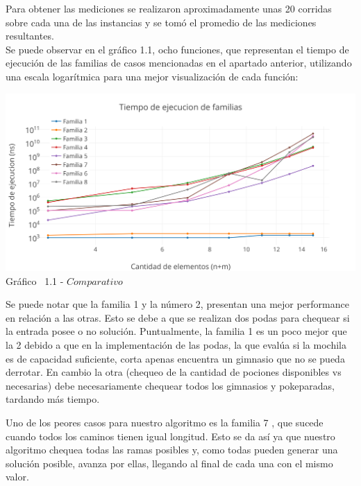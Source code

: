 Para obtener las mediciones se realizaron aproximadamente unas 20 corridas sobre cada una de las instancias y se tom\'o el promedio de las mediciones resultantes.\\ 

Se puede observar en el  gráfico 1.1, ocho funciones, que representan el tiempo de ejecuci\'on de las familias de casos mencionadas en el apartado anterior, utilizando una escala logar\'itmica para una mejor visualizaci\'on de cada funci\'on:\\


\vspace*{0.3cm} \vspace*{0.3cm}
  \begin{center}
 \includegraphics[scale=0.65]{./EJ1/comparativo.png}
 {Gr\'afico \ 1.1 - $Comparativo$}
  \end{center}
  \vspace*{0.3cm}

  
Se puede notar que la familia 1 y la n\'umero 2, presentan una mejor performance en relaci\'on a las otras. Esto se debe a que se realizan dos podas para chequear si la entrada posee o no soluci\'on. Puntualmente, la familia 1 es un poco mejor que la 2 debido a que en la implementaci\'on de las podas, la que evalúa si la mochila es de capacidad suficiente, corta apenas encuentra un gimnasio que no se pueda derrotar. En cambio la otra (chequeo de la cantidad de pociones disponibles vs necesarias) debe necesariamente chequear todos los gimnasios y pokeparadas, tardando más tiempo.

Uno de los peores casos para nuestro algoritmo es la familia 7 , que sucede cuando todos los caminos tienen igual longitud. Esto se da as\'i ya que nuestro algoritmo chequea todas las ramas posibles y, como todas pueden generar una soluci\'on posible, avanza por ellas, llegando al final de cada una con el mismo valor.\\

